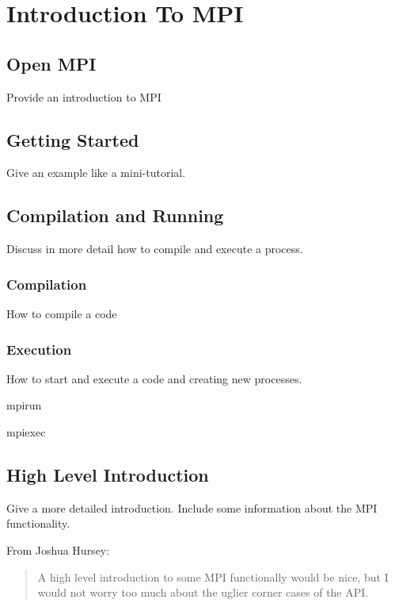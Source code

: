 
\chapter{Introduction To MPI}

\section{Open MPI}

Provide an introduction to MPI

\section{Getting Started}

Give an example like a mini-tutorial.

\section{Compilation and Running}

Discuss in more detail how to compile and execute a process. 

\subsection{Compilation}

How to compile a code

\subsection{Execution}

How to start and execute a code and creating new processes. 

mpirun

mpiexec

\section{High Level Introduction}

Give a more detailed introduction. Include some information about the
MPI functionality. 

From Joshua Hursey: 
\begin{quote}
  A high level introduction to some MPI functionally would be nice,
  but I would not worry too much about the uglier corner cases of the
  API.
\end{quote}



